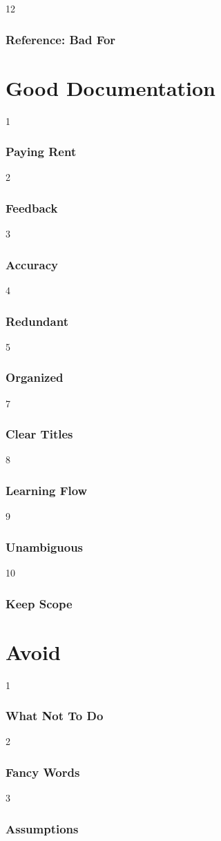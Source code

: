 12
\begin{frame}
\frametitle{Reference: Bad For}
\end{frame}

\section{Good Documentation}

1
\begin{frame}
\frametitle{Paying Rent}
\end{frame}

2
\begin{frame}
\frametitle{Feedback}
\end{frame}

3
\begin{frame}
\frametitle{Accuracy}
\end{frame}

4
\begin{frame}
\frametitle{Redundant}
\end{frame}

5
\begin{frame}
\frametitle{Organized}
\end{frame}

7
\begin{frame}
\frametitle{Clear Titles}
\end{frame}

8
\begin{frame}
\frametitle{Learning Flow}
\end{frame}

9
\begin{frame}
\frametitle{Unambiguous}
\end{frame}

10
\begin{frame}
\frametitle{Keep Scope}
\end{frame}

\section{Avoid}

1
\begin{frame}
\frametitle{What Not To Do}
\end{frame}

2
\begin{frame}
\frametitle{Fancy Words}
\end{frame}

3
\begin{frame}
\frametitle{Assumptions}
\end{frame}

